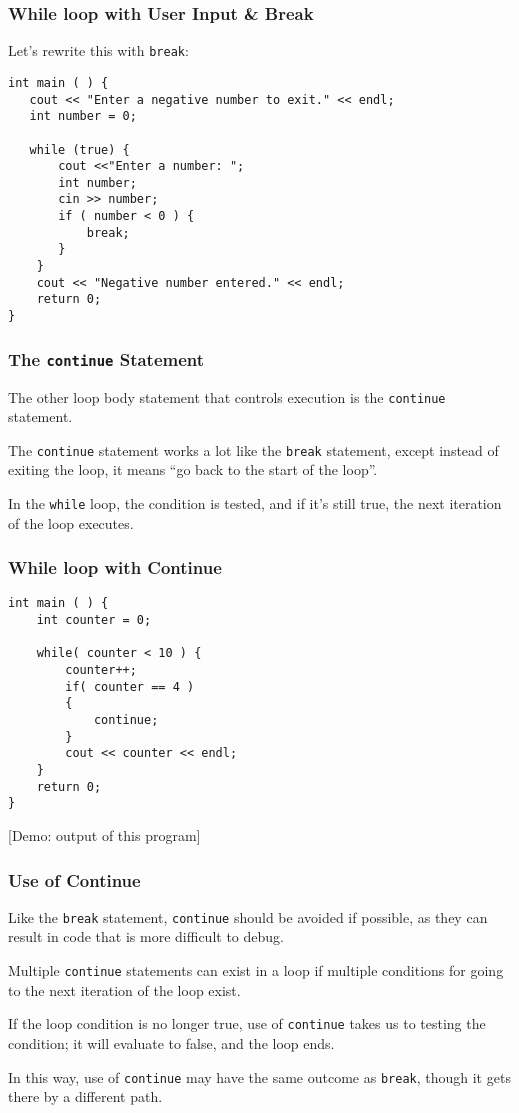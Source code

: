 \begin{frame}[fragile]
\frametitle{While loop with User Input \& Break}

Let's rewrite this with \texttt{break}:

\begin{verbatim}
int main ( ) {
   cout << "Enter a negative number to exit." << endl;
   int number = 0;
    
   while (true) {
       cout <<"Enter a number: ";
       int number;
       cin >> number;
       if ( number < 0 ) {
           break;
       }
    }
    cout << "Negative number entered." << endl;
    return 0;
}    

\end{verbatim}
\end{frame}

\begin{frame}
\frametitle{The \texttt{continue} Statement}
The other loop body statement that controls execution is the \texttt{continue} statement.

The \texttt{continue} statement works a lot like the \texttt{break} statement, except instead of exiting the loop, it means ``go back to the start of the loop''.

In the \texttt{while} loop, the condition is tested, and if it's still true, the next iteration of the loop executes.

\end{frame}

\begin{frame}[fragile]
\frametitle{While loop with Continue}

\begin{verbatim}
int main ( ) {
    int counter = 0;

    while( counter < 10 ) {
        counter++;
        if( counter == 4 )
        {
            continue;
        }
        cout << counter << endl;
    }
    return 0;
}
\end{verbatim}

[Demo: output of this program]

\end{frame}

\begin{frame}
\frametitle{Use of Continue}
Like the \texttt{break} statement, \texttt{continue} should be avoided if possible, as they can result in code that is more difficult to debug.

Multiple \texttt{continue} statements can exist in a loop if multiple conditions for going to the next iteration of the loop exist.

If the loop condition is no longer true, use of \texttt{continue} takes us to testing the condition; it will evaluate to false, and the loop ends.

In this way, use of \texttt{continue} may have the same outcome as \texttt{break}, though it gets there by a different path.

\end{frame}

